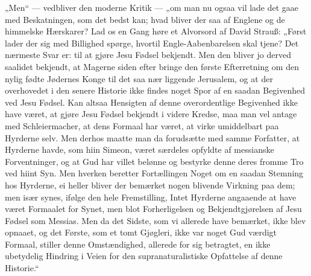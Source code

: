 \documentclass[12pt,a4paper]{book}
\begin{document}
%
„Men“ --- vedbliver den moderne Kritik --- „om man nu ogsaa vil lade det gaae med
Beskatningen, som det bedst kan; hvad bliver der saa af Englene og de himmelske
Hærskarer? Lad os en Gang høre et Alvorsord af David Strauß: „Først lader der sig
med Billighed spørge, hvortil Engle-Aabenbarelsen skal tjene? Det nærmeste Svar
er: til at gjøre Jesu Fødsel bekjendt. Men den bliver jo derved saalidet
bekjendt, at Magerne siden efter bringe den første Efterretning om den nylig
fødte Jødernes Konge til det saa nær liggende Jerusalem, og at der overhovedet i
den senere Historie ikke findes noget Spor af en saadan Begivenhed ved Jesu
Fødsel. Kan altsaa Hensigten af denne overordentlige Begivenhed ikke have været,
at gjøre Jesu Fødsel bekjendt i videre Kredse, maa man vel antage med
Schleiermacher, at dens Formaal har været, at virke umiddelbart paa Hyrderne
selv. Men derhos
maatte man da forudsætte med samme Forfatter, at Hyrderne havde, som hiin Simeon,
været særdeles opfyldte af messianske Forventninger, og at Gud har villet belønne
og bestyrke denne deres fromme Tro ved hiint Syn. Men hverken beretter
Fortællingen Noget om en saadan Stemning hos Hyrderne, ei heller bliver der
bemærket nogen blivende Virkning paa dem; men især synes, ifølge den hele
Fremstilling, Intet Hyrderne angaaende at have været Formaalet for Synet, men
blot Forherligelsen og Bekjendtgjørelsen af Jesu Fødsel som Messias. Men da det
Sidste, som vi allerede have bemærket, ikke blev opnaaet, og det Første, som et
tomt Gjøgleri, ikke var noget Gud værdigt Formaal, stiller denne Omstændighed,
allerede for sig betragtet, en ikke ubetydelig Hindring i Veien for den
supranaturalistiske Opfattelse af denne Historie.“
\end{document}
